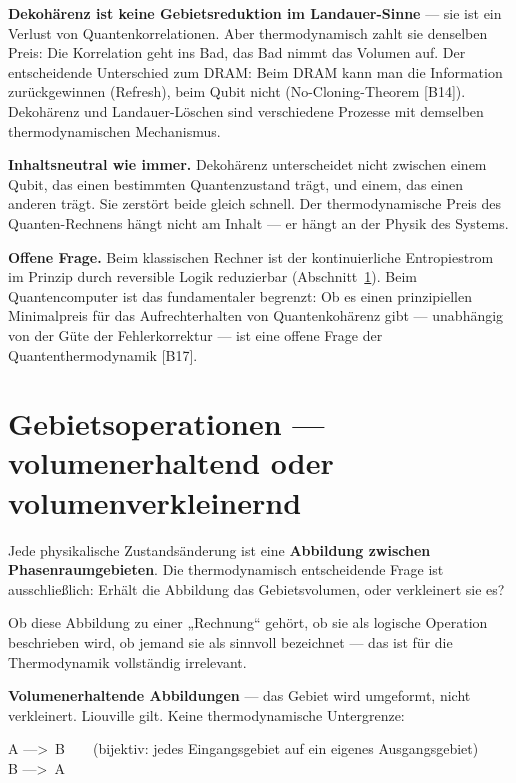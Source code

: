 \textbf{Dekohärenz ist keine Gebietsreduktion im Landauer-Sinne} --- sie ist ein
Verlust von Quantenkorrelationen. Aber thermodynamisch zahlt sie denselben Preis:
Die Korrelation geht ins Bad, das Bad nimmt das Volumen auf. Der entscheidende
Unterschied zum DRAM: Beim DRAM kann man die Information zurückgewinnen
(Refresh), beim Qubit nicht (No-Cloning-Theorem [B14]). Dekohärenz und
Landauer-Löschen sind verschiedene Prozesse mit demselben thermodynamischen
Mechanismus.

\textbf{Inhaltsneutral wie immer.} Dekohärenz unterscheidet nicht zwischen einem
Qubit, das einen bestimmten Quantenzustand trägt, und einem, das einen anderen
trägt. Sie zerstört beide gleich schnell. Der thermodynamische Preis des
Quanten-Rechnens hängt nicht am Inhalt --- er hängt an der Physik des Systems.

\LH \textbf{Offene Frage.} Beim klassischen Rechner ist der kontinuierliche
Entropiestrom im Prinzip durch reversible Logik reduzierbar
(Abschnitt~\ref{sec:gebietsop}). Beim Quantencomputer ist das fundamentaler
begrenzt: Ob es einen prinzipiellen Minimalpreis für das Aufrechterhalten von
Quantenkohärenz gibt --- unabhängig von der Güte der Fehlerkorrektur --- ist eine
offene Frage der Quantenthermodynamik [B17].

\section{Gebietsoperationen --- volumenerhaltend oder volumenverkleinernd}
\label{sec:gebietsop}

Jede physikalische Zustandsänderung ist eine \textbf{Abbildung zwischen
Phasenraumgebieten}. Die thermodynamisch entscheidende Frage ist ausschließlich:
Erhält die Abbildung das Gebietsvolumen, oder verkleinert sie es?

Ob diese Abbildung zu einer „Rechnung“ gehört, ob sie als logische Operation
beschrieben wird, ob jemand sie als sinnvoll bezeichnet --- das ist für die
Thermodynamik vollständig irrelevant.

\LB \textbf{Volumenerhaltende Abbildungen} --- das Gebiet wird umgeformt, nicht
verkleinert. Liouville gilt. Keine thermodynamische Untergrenze:

\begin{center}
\begin{minipage}{0.75\textwidth}
\ttfamily\small
A --->\ B\ \ \ \ (bijektiv: jedes Eingangsgebiet auf ein eigenes Ausgangsgebiet)\\
B --->\ A
\end{minipage}
\end{center}

